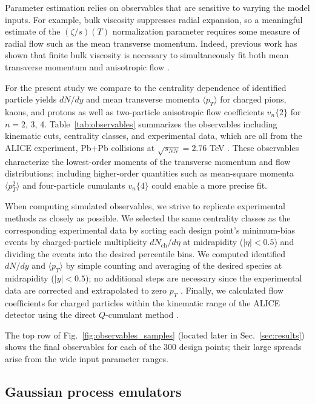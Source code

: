 \documentclass[aps,prc,reprint,amsmath,nofootinbib,noeprint]{revtex4-1}
\newcommand{\avg}[1]{\langle #1 \rangle}
\newcommand{\nch}{N_\text{ch}}
\newcommand{\sqrts}{\sqrt{s_{NN}}}
\newcommand{\vnk}[2]{v_#1\{#2\}}
\begin{document}
Parameter estimation relies on observables that are sensitive to varying the model inputs.
For example, bulk viscosity suppresses radial expansion, so a meaningful estimate of the $(\zeta/s)(T)$ normalization parameter requires some measure of radial flow such as the mean transverse momentum.
Indeed, previous work has shown that finite bulk viscosity is necessary to simultaneously fit both mean transverse momentum and anisotropic flow \cite{Ryu:2015vwa}.

For the present study we compare to the centrality dependence of identified particle yields $dN/dy$ and mean transverse momenta $\avg{p_T}$ for charged pions, kaons, and protons as well as two-particle anisotropic flow coefficients $\vnk n 2$ for $n = 2$, 3, 4.
Table~\ref{tab:observables} summarizes the observables including kinematic cuts, centrality classes, and experimental data, which are all from the ALICE experiment, Pb+Pb collisions at $\sqrts = 2.76$ TeV \cite{Abelev:2013vea,ALICE:2011ab}.
These observables characterize the lowest-order moments of the transverse momentum and flow distributions;
including higher-order quantities such as mean-square momenta $\avg{p_T^2}$ \cite{Heinz:2015arc} and four-particle cumulants $\vnk n 4$ \cite{Aamodt:2010pa} could enable a more precise fit.

When computing simulated observables, we strive to replicate experimental methods as closely as possible.
We selected the same centrality classes as the corresponding experimental data by sorting each design point's minimum-bias events by charged-particle multiplicity $d\nch/d\eta$ at midrapidity ($|\eta| < 0.5$) and dividing the events into the desired percentile bins.
We computed identified $dN/dy$ and $\avg{p_T}$ by simple counting and averaging of the desired species at midrapidity ($|y| < 0.5$); no additional steps are necessary since the experimental data are corrected and extrapolated to zero $p_T$ \cite{Abelev:2013vea}.
Finally, we calculated flow coefficients for charged particles within the kinematic range of the ALICE detector using the direct $Q$-cumulant method \cite{Bilandzic:2010jr}.

The top row of Fig.~\ref{fig:observables_samples} (located later in Sec.~\ref{sec:results}) shows the final observables for each of the 300 design points;
their large spreads arise from the wide input parameter ranges.

\subsection{Gaussian process emulators}
\end{document}
